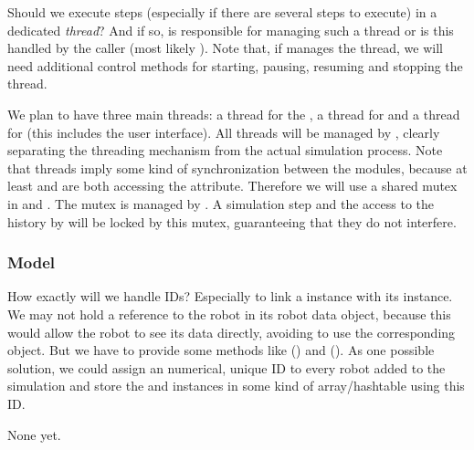 \begin{appendix}
\begin{designQuestion}
	Should we execute steps (especially if there are several steps to execute) in a dedicated \emph{thread}? And if so, is  responsible for managing such a thread or is this handled by the caller (most likely ). Note that, if  manages the thread, we will need additional control methods for starting, pausing, resuming and stopping the thread.
	\end{designQuestion}
	\begin{resolution}
	We plan to have three main threads: a thread for the , a thread for  and a thread for  (this includes the user interface). All threads will be managed by , clearly separating the threading mechanism from the actual simulation process. Note that threads imply some kind of synchronization between the modules, because at least  and  are both accessing the  attribute. Therefore we will use a shared mutex in  and . The mutex is managed by . A simulation step and the access to the history by  will be locked by this mutex, guaranteeing that they do not interfere.
	\end{resolution}

\subsubsection{Model}	

	\begin{designQuestion}
	How exactly will we handle IDs? Especially to link a  instance with its  instance. We may not hold a reference to the robot in its robot data object, because this would allow the robot to see its data directly, avoiding to use the corresponding  object. But we have to provide some methods like () and (). As one possible solution, we could assign an numerical, unique ID to every robot added to the simulation and store the  and  instances in some kind of array/hashtable using this ID.
	\end{designQuestion}
	\begin{resolution}
	None yet.
	\end{resolution}
	

\end{appendix}
